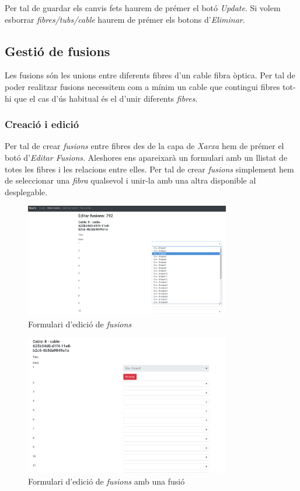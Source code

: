 \documentclass[a4paper]{article}
\begin{document}
	Per tal de guardar els canvis fets haurem de prémer el botó \emph{Update}. Si volem esborrar \emph{fibres/tubs/cable} haurem de prémer els botons d'\emph{Eliminar}.
	
	\subsection{Gestió de fusions}
	Les fusions són les unions entre diferents fibres d'un cable fibra òptica. Per tal de poder realitzar fusions necessitem com a mínim un cable que contingui fibres tot-hi que el cas d'ús habitual és el d'unir diferents \emph{fibres}.
	
	\subsubsection{Creació i edició}
	Per tal de crear \emph{fusions} entre fibres des de la capa de \emph{Xarxa} hem de prémer el botó d'\emph{Editar Fusions}. Aleshores ens apareixarà un formulari amb un llistat de totes les fibres i les relacions entre elles. Per tal de crear \emph{fusions} simplement hem de seleccionar una \emph{fibra} qualsevol i unir-la amb una altra disponible al desplegable.
	
	\begin{figure}[H]
		\centering
		\includegraphics[width=0.8\textwidth]{images/fusions_edit_form_disponible.png}
		\caption{Formulari d'edició de \emph{fusions}}
	\end{figure}

	\begin{figure}[H]
		\centering
		\includegraphics[width=0.8\textwidth]{images/fusions_edit_form_fusion.png}
		\caption{Formulari d'edició de \emph{fusions} amb una fusió}
	\end{figure}
\end{document}
